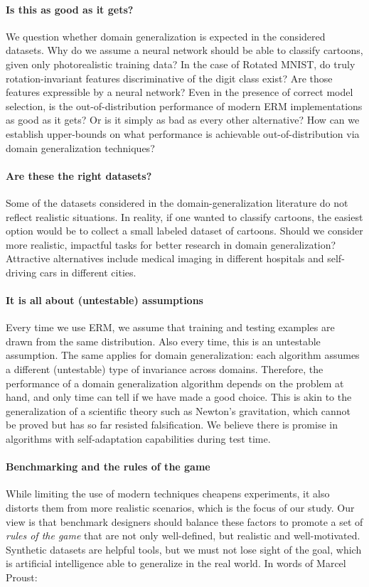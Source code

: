 \documentclass{article}
\begin{document}
\paragraph{Is this as good as it gets?}
%
We question whether domain generalization is expected in the considered datasets.
%
Why do we assume a neural network should be able to classify cartoons, given only photorealistic training data?
%
In the case of Rotated MNIST, do truly rotation-invariant features discriminative of the digit class exist? Are those features expressible by a neural network?
%
Even in the presence of correct model selection, is the out-of-distribution performance of modern ERM implementations as good as it gets?
%
Or is it simply as bad as every other alternative?
%
How can we establish upper-bounds on what performance is achievable out-of-distribution via domain generalization techniques?

\paragraph{Are these the right datasets?}
%
Some of the datasets considered in the domain-generalization literature do not reflect realistic situations.
%
In reality, if one wanted to classify cartoons, the easiest option would be to collect a small labeled dataset of cartoons.
%
Should we consider more realistic, impactful tasks for better research in domain generalization? 
%
Attractive alternatives include medical imaging in different hospitals and self-driving cars in different cities.

\paragraph{It is all about (untestable) assumptions}
%
Every time we use ERM, we assume that training and testing examples are drawn from the same distribution.
%
Also every time, this is an untestable assumption.
%
The same applies for domain generalization: each algorithm assumes a different (untestable) type of invariance across domains.
%
Therefore, the performance of a domain generalization algorithm depends on the problem at hand, and only time can tell if we have made a good choice.
%
This is akin to the generalization of a scientific theory such as Newton's gravitation, which cannot be proved but has so far resisted falsification.
%
We believe there is promise in algorithms with self-adaptation capabilities during test time.

\paragraph{Benchmarking and the rules of the game}
%
While limiting the use of modern techniques cheapens experiments, it also distorts them from more realistic scenarios, which is the focus of our study.
%
Our view is that benchmark designers should balance these factors to promote a set of \emph{rules of the game} that are not only well-defined, but realistic and well-motivated.
%
Synthetic datasets are helpful tools, but we must not lose sight of the goal, which is artificial intelligence able to generalize in the real world.
%
In words of Marcel Proust:
\end{document}
